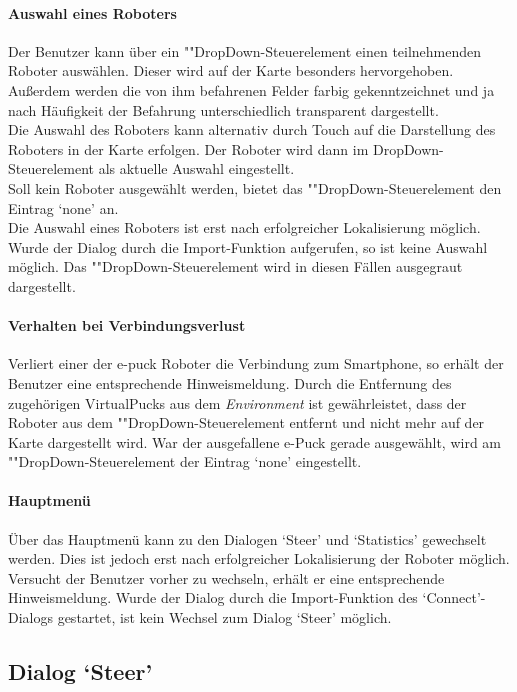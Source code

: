 \documentclass[10pt,a4paper]{article}
\begin{document}
	\paragraph*{Auswahl eines Roboters} Der Benutzer kann über ein ""Drop\-Down-Steu\-er\-ele\-ment einen teilnehmenden Roboter auswählen. Dieser
	wird auf der Karte besonders hervorgehoben. Außerdem werden die von ihm befahrenen Felder farbig gekenntzeichnet und ja nach Häufigkeit der
	Befahrung unterschiedlich transparent dargestellt. \\
	Die Auswahl des Roboters kann alternativ durch Touch auf die Darstellung des Roboters in der Karte erfolgen. Der Roboter wird dann im
	DropDown-Steuerelement als aktuelle Auswahl eingestellt. \\
	Soll kein Roboter ausgewählt werden, bietet das ""Drop\-Down-Steu\-er\-ele\-ment den Eintrag `none' an. \\ 
	Die Auswahl eines Roboters ist erst nach erfolgreicher Lokalisierung möglich. Wurde der Dialog durch die Import-Funktion aufgerufen, so ist keine
	Auswahl möglich. Das ""Drop\-Down-Steu\-er\-ele\-ment wird in diesen Fällen ausgegraut dargestellt.
	
	\paragraph*{Verhalten bei Verbindungsverlust} Verliert einer der e-puck Roboter die Verbindung zum Smartphone, so erhält der Benutzer eine
	entsprechende Hinweismeldung. Durch die Entfernung des zugehörigen VirtualPucks aus dem \textit{Environment} ist gewährleistet, dass der Roboter aus
	dem ""Drop\-Down-Steu\-er\-ele\-ment entfernt und nicht mehr auf der Karte dargestellt wird. War der ausgefallene e-Puck gerade ausgewählt, wird
	am ""Drop\-Down-Steu\-er\-ele\-ment der Eintrag `none' eingestellt.
	
	\paragraph*{Hauptmenü} Über das Hauptmenü kann zu den Dialogen `Steer' und `Statistics' gewechselt werden. Dies ist jedoch erst nach
	erfolgreicher Lokalisierung der Roboter möglich. Versucht der Benutzer vorher zu wechseln, erhält er eine entsprechende Hinweismeldung.
	Wurde der Dialog durch die Import-Funktion des `Connect'-Dialogs gestartet, ist kein Wechsel zum Dialog `Steer' möglich.

	\subsection*{Dialog `Steer'}
	
\end{document}
